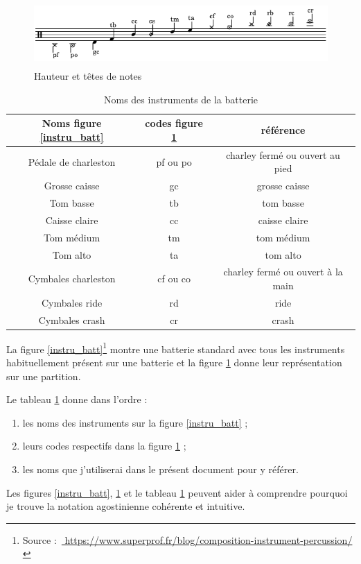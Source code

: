 \begin{figure}[!h]
\centering
\includegraphics[height=25mm, width=130mm]{
z_images/3_methodes/0_notation_de_la_batterie/2_hauteurs_et_tete_de_notes.png}
\caption{Hauteur et têtes de notes}
\label{haut}
\end{figure}

\begin{table}[h]
\centering
\begin{tabular}{|c|c|c|} \hline
Noms figure \ref{instru_batt} & codes figure \ref{haut}  & référence \\ \hline
Pédale de charleston & pf ou po & charley fermé ou ouvert au pied \\
Grosse caisse & gc & grosse caisse \\
Tom basse & tb & tom basse \\
Caisse claire & cc & caisse claire \\
Tom médium & tm & tom médium \\
Tom alto & ta & tom alto \\
Cymbales charleston & cf ou co & charley fermé ou ouvert à la main \\
Cymbales ride & rd & ride \\
Cymbales crash & cr & crash \\ \hline
	\end{tabular}
	\caption{Noms des instruments de la batterie}
	\label{nom_instru_batt}
\end{table}\newpage
La figure \ref{instru_batt}\footnote{Source : \url{
https://www.superprof.fr/blog/composition-instrument-percussion/}} montre une
batterie standard avec tous les instruments habituellement présent sur une
batterie et la figure \ref{haut} donne leur représentation sur une partition.

Le tableau \ref{nom_instru_batt} donne dans l’ordre :
\begin{enumerate}
    \item les noms des instruments sur la figure \ref{instru_batt} ;
    \item leurs codes respectifs dans la figure \ref{haut} ;
    \item les noms que j’utiliserai dans le présent document pour y référer.
\end{enumerate}
Les figures \ref{instru_batt}, \ref{haut} et le tableau \ref{nom_instru_batt}
peuvent aider à comprendre pourquoi je trouve la notation agostinienne
cohérente et intuitive.

